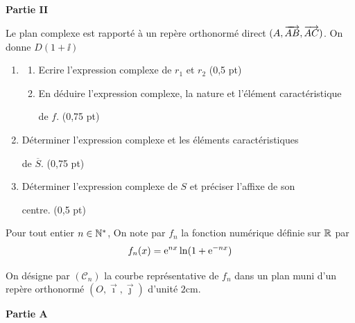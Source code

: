\medskip
\noindent\textbf{Partie II}

Le plan complexe est rapporté à un repère orthonormé direct $(A,\overrightarrow{AB},\overrightarrow{AC})$. On donne
$D(1+\ii)$

\begin{enumerate}
	\item
	\begin{enumerate}
		\item Ecrire l'expression complexe de $r_1$ et $r_2$ \hfill (0,5 pt)
		\item En déduire l'expression complexe, la nature et l'élément caractéristique

		de $f$. \hfill (0,75 pt)
	\end{enumerate}
	\item Déterminer l'expression complexe et les éléments caractéristiques

	de $\overline{S}$. \hfill (0,75 pt)
	\item Déterminer l'expression complexe de $S$ et préciser l'affixe de son

	centre. \hfill (0,5 pt)
\end{enumerate}




Pour tout entier $n \in \mathbb{N}^*$, On note par $f_n$ la fonction numérique définie sur $\mathbb{R}$ par
$$
f_n(x) = \mathrm{e}^{nx}\ln(1+\mathrm{e}^{-nx})
$$

On désigne par $(\mathscr{C}_n)$ la courbe représentative de $f_n$ dans un plan muni d'un repère orthonormé $(O,\vec{\imath},\vec{\jmath})$ d'unité $2\text{cm}$.

\medskip
\noindent\textbf{Partie A}

